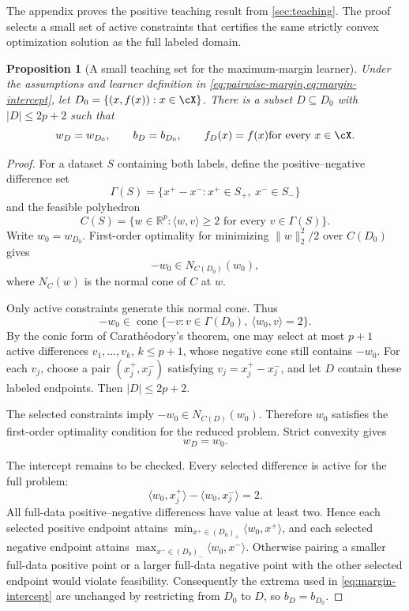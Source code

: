 \documentclass[11pt,twoside]{article}
\newcommand{\R}{\mathbb R}
\newtheorem{proposition}[theorem]{Proposition}
\theoremstyle{definition}
\theoremstyle{remark}
\begin{document}
The appendix proves the positive teaching result from
\cref{sec:teaching}. The proof selects a small set of active constraints that
certifies the same strictly convex optimization solution as the full labeled
domain.

\begin{proposition}[A small teaching set for the maximum-margin learner]
\label{prop:max-margin-teaching-restated}
Under the assumptions and learner definition in
\cref{eq:pairwise-margin,eq:margin-intercept}, let
\(D_0=\{(x,f(x)):x\in\cX\}\). There is a subset
\(D\subseteq D_0\) with \(|D|\le2p+2\) such that
\[
 w_D=w_{D_0},\qquad b_D=b_{D_0},\qquad
 f_D(x)=f(x)\quad\text{for every }x\in\cX.
\]
\end{proposition}
\begin{proof}
For a dataset \(S\) containing both labels, define the positive--negative
difference set
\[
 \Gamma(S)=\{x^+-x^-:x^+\in S_+,\ x^-\in S_-\}
\]
and the feasible polyhedron
\[
 C(S)=\{w\in\R^p:\langle w,v\rangle\ge2
                    \text{ for every }v\in\Gamma(S)\}.
\]
Write \(w_0=w_{D_0}\). First-order optimality for minimizing
\(\lVert w\rVert_2^2/2\) over \(C(D_0)\) gives
\begin{equation}
 -w_0\in N_{C(D_0)}(w_0),
 \label{eq:normal-cone-condition}
\end{equation}
where \(N_C(w)\) is the normal cone of \(C\) at \(w\).

Only active constraints generate this normal cone. Thus
\begin{equation}
 -w_0\in\operatorname{cone}
 \{-v:v\in\Gamma(D_0),\ \langle w_0,v\rangle=2\}.
 \label{eq:active-cone}
\end{equation}
By the conic form of Carath\'eodory's theorem, one may select at most
\(p+1\) active differences \(v_1,\ldots,v_k\), \(k\le p+1\), whose negative
cone still contains \(-w_0\). For each \(v_j\), choose a pair
\((x_j^+,x_j^-)\) satisfying \(v_j=x_j^+-x_j^-\), and let \(D\) contain
these labeled endpoints. Then \(|D|\le2p+2\).

The selected constraints imply
\(-w_0\in N_{C(D)}(w_0)\). Therefore \(w_0\) satisfies the first-order
optimality condition for the reduced problem. Strict convexity gives
\begin{equation}
 w_D=w_0.
 \label{eq:same-direction}
\end{equation}

The intercept remains to be checked. Every selected difference is active for
the full problem:
\[
 \langle w_0,x_j^+\rangle-\langle w_0,x_j^-\rangle=2.
\]
All full-data positive--negative differences have value at least two. Hence
each selected positive endpoint attains
\(\min_{x^+\in(D_0)_+}\langle w_0,x^+\rangle\), and each selected negative
endpoint attains
\(\max_{x^-\in(D_0)_-}\langle w_0,x^-\rangle\). Otherwise pairing a smaller
full-data positive point or a larger full-data negative point with the other
selected endpoint would violate feasibility. Consequently the extrema used in
\cref{eq:margin-intercept} are unchanged by restricting from \(D_0\) to
\(D\), so \(b_D=b_{D_0}\).


\end{proof}
\end{document}
